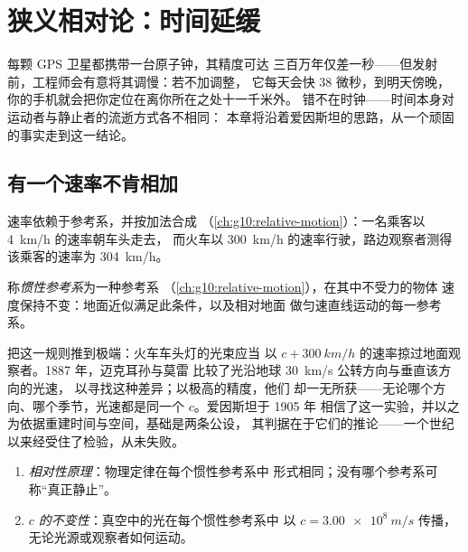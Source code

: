 \chapter{狭义相对论：时间延缓}\label{ch:g12:special-relativity}

每颗 GPS 卫星都携带一台原子钟，其精度可达
三百万年仅差一秒——但发射前，工程师会有意将其调慢：若不加调整，
它每天会快 38 微秒，到明天傍晚，
你的手机就会把你定位在离你所在之处十一千米外。
错不在时钟——时间本身对运动者与静止者的流逝方式各不相同：
本章将沿着爱因斯坦的思路，从一个顽固的事实走到这一结论。

\section{有一个速率不肯相加}

速率依赖于参考系，并按加法合成
（\cref{ch:g10:relative-motion}）：一名乘客以 \qty{4}{km/h} 的速率朝车头走去，
而火车以 \qty{300}{km/h} 的速率行驶，路边观察者测得该乘客的速率为 \qty{304}{km/h}。

\begin{definition}[惯性参考系]\label{def:g12:special-relativity:inertial}
称\emph{惯性参考系}为一种参考系
（\cref{ch:g10:relative-motion}），在其中不受力的物体
速度保持不变：地面近似满足此条件，以及相对地面
做匀速直线运动的每一参考系。
\end{definition}

把这一规则推到极端：火车车头灯的光束应当
以 $c + \qty{300}{km/h}$ 的速率掠过地面观察者。1887 年，迈克耳孙与莫雷
比较了光沿地球 \qty{30}{km/s} 公转方向与垂直该方向的光速，
以寻找这种差异；以极高的精度，他们
却一无所获——无论哪个方向、哪个季节，光速都是同一个 $c$。爱因斯坦于 1905 年
相信了这一实验，并以之为依据重建时间与空间，基础是两条公设，
其判据在于它们的推论——一个世纪以来经受住了检验，从未失败。

\begin{theorem}[狭义相对论的两条公设]\label{thm:g12:special-relativity:postulates}
\begin{enumerate}
  \item \emph{相对性原理}：物理定律在每个惯性参考系中
        形式相同；没有哪个参考系可称“真正静止”。
  \item \emph{$c$ 的不变性}：真空中的光在每个惯性参考系中
        以 $c = \qty{3.00e8}{m/s}$ 传播，
        无论光源或观察者如何运动。
\end{enumerate}
\end{theorem}
\admitted

